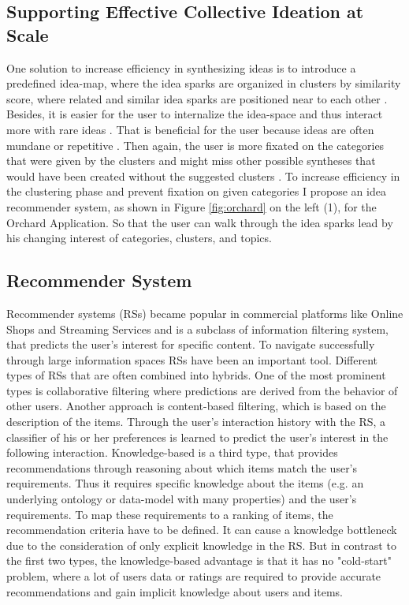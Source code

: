 \documentclass[pdftex,a4paper,12pt]{scrartcl}
\theoremstyle{definition}
\begin{document}
\subsection{Supporting Effective Collective Ideation at Scale}
    One solution to increase efficiency in synthesizing ideas is to introduce a predefined idea-map, where the idea sparks are organized in clusters by similarity score, where related and similar idea sparks are positioned near to each other \citep[124]{siangliulue_supporting_2017}. Besides, it is easier for the user to internalize the idea-space and thus interact more with rare ideas \citep{siangliulue_supporting_2017}. That is beneficial for the user because ideas are often mundane or repetitive \citep{siangliulue_ideahound:_2016}. Then again, the user is more fixated on the categories that were given by the clusters and might miss other possible syntheses that would have been created without the suggested clusters \citep{siangliulue_supporting_2017}. To increase efficiency in the clustering phase and prevent fixation on given categories I propose an idea recommender system, as shown in Figure \ref{fig:orchard} on the left (1), for the Orchard Application. So that the user can walk through the idea sparks lead by his changing interest of categories, clusters, and topics. 
    
\subsection{Recommender System}
Recommender systems (RSs) became popular in commercial platforms like Online Shops and Streaming Services and is a subclass of information filtering system, that predicts the user's interest for specific content. To navigate successfully through large information spaces RSs have been an important tool. Different types of RSs that are often combined into hybrids. One of the most prominent types is collaborative filtering where predictions are derived from the behavior of other users. Another approach is content-based filtering, which is based on the description of the items. Through the user's interaction history with the RS, a classifier of his or her preferences is learned to predict the user's interest in the following interaction. 
Knowledge-based is a third type, that provides recommendations through reasoning about which items match the user's requirements. Thus it requires specific knowledge about the items (e.g. an underlying ontology or data-model with many properties) and the user's requirements. To map these requirements to a ranking of items, the recommendation criteria have to be defined. It can cause a knowledge bottleneck due to the consideration of only explicit knowledge in the RS.
But in contrast to the first two types, the knowledge-based advantage is that it has no "cold-start" problem, where a lot of users data or ratings are required to provide accurate recommendations and gain implicit knowledge about users and items. 
\end{document}
